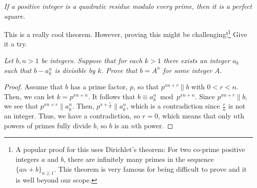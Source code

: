 \documentclass[main.tex]{subfile}
\begin{document}
		\begin{theorem}\slshape
			If a positive integer is a quadratic residue modulo every prime, then it is a perfect square.
		\end{theorem}
	This is a really cool theorem. However, proving this might be challenging!\footnote{A popular proof for this uses Dirichlet's theorem: For two co-prime positive integers $a$ and $b$, there are infinitely many primes in the sequence $\{an+b\}_{n\geq1}$. This theorem is very famous for being difficult to prove and it is well beyond our scope.} Give it a try.
		\begin{theorem}\slshape
			Let $b,n > 1$ be integers. Suppose that for each $k > 1$ there exists an integer $a_k$ such that $b - a^n_k$ is divisible by $k$. Prove that $b = A^n$ for some integer $A$.
		\end{theorem}

		\begin{proof}
			Assume that $ b$ has a prime factor, $ p$, so that $ p^{xn + r}\|b$ with $ 0 < r < n$. Then, we can let $ k = p^{xn + n}$. It follows that $ b\equiv a_k^n\bmod p^{xn + n}$. Since $ p^{xn + r}\|b$, we see that $ p^{xn + r}\|a_k^n$. Then, $ p^{x + \frac {r}{n}}\|a_k^n$, which is a contradiction since $ \frac {r}{n}$ is not an integer. Thus, we have a contradiction, so $ r = 0$, which means that only $ n$th powers of primes fully divide $ b$, so $ b$ is an $ n$th power.
		\end{proof}
\end{document}
